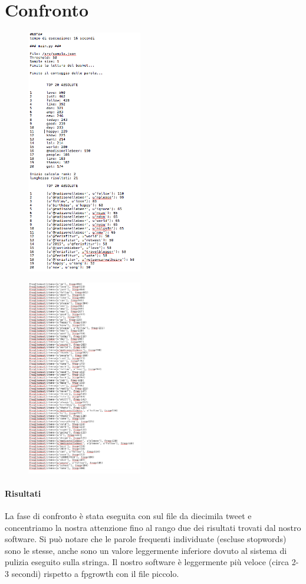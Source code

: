 \documentclass{article}
\begin{document}
\section{Confronto}
\begin{figure}[h]
  \begin{center}
  \includegraphics[width=190px]{sample1.jpg}
  \end{center}
\end{figure}


\begin{figure}[h]
  \begin{center}
  \includegraphics[width=190px]{samplefp}
  \end{center}
\end{figure}



\paragraph{Risultati} La fase di confronto è stata eseguita con sul file da diecimila tweet e concentriamo la nostra attenzione fino al rango due dei risultati trovati dal nostro software.
Si può notare che le parole frequenti individuate (escluse stopwords) sono le stesse, anche sono un valore leggermente inferiore dovuto al sistema di pulizia eseguito sulla stringa. 
Il nostro software è leggermente più veloce (circa 2-3 secondi) rispetto a fpgrowth con il file piccolo.
\end{document}
